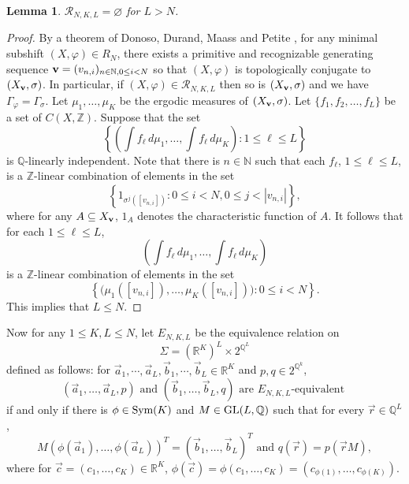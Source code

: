 \documentclass{amsart}
\newtheorem{lemma}[theorem]{Lemma}
\theoremstyle{definition}
\theoremstyle{problem}
\theoremstyle{remark}
\numberwithin{equation}{section}
\begin{document}
\begin{lemma}\label{lem:NKL} $\mathcal{R}_{N,K,L}=\varnothing$ for $L>N$.
\end{lemma}

\begin{proof}
By a theorem of Donoso, Durand, Maass and Petite \cite[Theorem 4.1 (1)]{DDMP}, for any minimal subshift $(X,\varphi)\in R_N$, there exists a primitive and recognizable generating sequence ${\bf v}=(v_{n, i})_{n\in\mathbb{N},0\le i< N}$ so that $(X, \varphi)$ is topologically conjugate to $(X_{\bf v}, \sigma)$. In particular, if $(X, \varphi)\in \mathcal{R}_{N,K,L}$ then so is $(X_{\bf v},\sigma)$ and we have $\Gamma_\varphi=\Gamma_\sigma$. Let $\mu_1, \dots, \mu_K$ be the ergodic measures of $(X_{\bf v}, \sigma)$. Let $\{f_1, f_2,\dots, f_L\}$ be a set of $C(X,\mathbb Z)$. Suppose that the set
$$ \left\{ \left(\int f_\ell\, d\mu_1, \dots, \int f_\ell\, d\mu_K\right)\colon 1\leq \ell\leq L\right\} $$
is $\mathbb{Q}$-linearly independent. Note that there is $n\in\mathbb{N}$ such that each $f_\ell$, $1\leq \ell\leq L$, is a $\mathbb{Z}$-linear combination of elements in the set
$$ \left\{ 1_{\sigma^j([v_{n,i}])}\colon 0\leq i<N, 0\leq j<|v_{n,i}|\right\}, $$
where for any $A\subseteq X_{\bf v}$, $1_A$ denotes the characteristic function of $A$. It follows that for each $1\leq \ell\leq L$, 
$$ \left(\int f_\ell\, d\mu_1, \dots, \int f_\ell\, d\mu_K\right) $$
is a $\mathbb{Z}$-linear combination of elements in the set
$$ \left\{ \big(\mu_1([v_{n,i}]), \dots, \mu_K([v_{n,i}])\big)\colon 0\leq i<N\right\}. $$
This implies that $L\leq N$. 
\end{proof}


Now for any $1\le K, L\le N$, let $E_{N,K,L}$ be the equivalence relation on 
$$ \Sigma=(\mathbb{R}^K)^L\times 2^{\mathbb{Q}^L} $$
defined as follows: for $\vec{a}_1,\cdots, \vec{a}_L, \vec{b}_1,\cdots, \vec{b}_L\in \mathbb{R}^K$ and $p,q\in 2^{\mathbb{Q}^k}$, 
$$ \mbox{$(\vec{a}_1,\dots, \vec{a}_L,p)$ and $(\vec{b}_1,\dots, \vec{b}_L,q)$ are $E_{N,K,L}$-equivalent } $$
if and only if there is $\phi \in \mbox{\rm Sym}(K)$ and $M\in \mbox{\rm GL}(L,\mathbb{Q})$ such that for every $\vec{r}\in\mathbb{Q}^L$,
$$M(\phi(\vec{a}_1),\dots, \phi(\vec{a}_L))^T=(\vec{b}_1,\dots, \vec{b}_L)^T \mbox{ and } q(\vec{r})=p(\vec{r}M),$$ 
where for $\vec{c}=(c_1,\dots, c_K)\in \mathbb{R}^K$, $\phi(\vec{c})=\phi(c_1,\dots, c_K)=(c_{\phi(1)},\dots, c_{\phi(K)})$.
\end{document}
